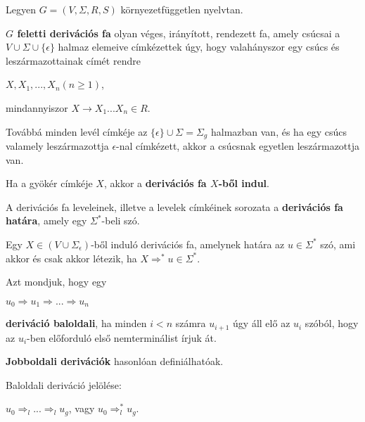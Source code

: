 \documentclass[10pt]{article}
\renewcommand{\\}{\par\noindent}
\begin{document}
\begin{frame}
\begin{tcolorbox}[title={Def.: Derivációs fa}]
Legyen $G = (V, {\Sigma}, R, S)$ környezetfüggetlen nyelvtan.\\
\textbf{$G$ feletti derivációs fa} olyan véges, irányított, rendezett fa, amely csúcsai a $V \cup {\Sigma} \cup \{{\epsilon}\}$ halmaz elemeive címkézettek úgy, hogy valahányszor egy csúcs és leszármazottainak címét rendre\\
\medskip
$X, X_1, ..., X_n (n \geq 1)$,\\
mindannyiszor $X \rightarrow X_1...X_n \in R$.\\
\medskip
Továbbá minden levél címkéje az $\{{\epsilon}\} \cup {\Sigma} = {\Sigma}_g$ halmazban van, és ha egy csúcs valamely leszármazottja $\epsilon$-nal címkézett, akkor a csúcsnak egyetlen leszármazottja van.\\
\bigskip
Ha a gyökér címkéje $X$, akkor a \textbf{derivációs fa $X$-ből indul}.\\
\bigskip
A derivációs fa leveleinek, illetve a levelek címkéinek sorozata a \textbf{derivációs fa határa}, amely egy ${\Sigma}^*$-beli szó.
\end{tcolorbox}
\end{frame}

\begin{frame}
\begin{tcolorbox}[title={Tétel: Derivációs fák}]
Egy $X \in (V \cup {\Sigma}_{\epsilon})$-ből induló derivációs fa, amelynek határa az $u \in {\Sigma}^*$ szó, ami akkor és csak akkor létezik, ha $X {\Rightarrow}^* u \in {\Sigma}^*$.
\end{tcolorbox}

\begin{tcolorbox}[title={Def.: Jobb-, Baloldali deriváció}]
Azt mondjuk, hogy egy\\
\bigskip
$u_0 \Rightarrow u_1 \Rightarrow ... \Rightarrow u_n$\\
\bigskip
\textbf{deriváció baloldali}, ha minden $i < n$ számra $u_{i + 1}$ úgy áll elő az $u_i$ szóból, hogy az $u_i$-ben előforduló első nemterminálist írjuk át.\\
\bigskip
\textbf{Jobboldali derivációk} hasonlóan definiálhatóak.\\
\bigskip
Baloldali deriváció jelölése:\\
\bigskip
$u_0 {\Rightarrow}_l ... {\Rightarrow}_l u_g$, vagy $u_0 {\Rightarrow}^*_l u_g$.
\end{tcolorbox}
\end{frame}
\end{document}
